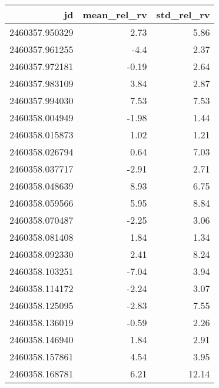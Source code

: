\begin{tabular}{rrr}
\toprule
jd & mean_rel_rv & std_rel_rv \\
\midrule
2460357.950329 & 2.73 & 5.86 \\
2460357.961255 & -4.4 & 2.37 \\
2460357.972181 & -0.19 & 2.64 \\
2460357.983109 & 3.84 & 2.87 \\
2460357.994030 & 7.53 & 7.53 \\
2460358.004949 & -1.98 & 1.44 \\
2460358.015873 & 1.02 & 1.21 \\
2460358.026794 & 0.64 & 7.03 \\
2460358.037717 & -2.91 & 2.71 \\
2460358.048639 & 8.93 & 6.75 \\
2460358.059566 & 5.95 & 8.84 \\
2460358.070487 & -2.25 & 3.06 \\
2460358.081408 & 1.84 & 1.34 \\
2460358.092330 & 2.41 & 8.24 \\
2460358.103251 & -7.04 & 3.94 \\
2460358.114172 & -2.24 & 3.07 \\
2460358.125095 & -2.83 & 7.55 \\
2460358.136019 & -0.59 & 2.26 \\
2460358.146940 & 1.84 & 2.91 \\
2460358.157861 & 4.54 & 3.95 \\
2460358.168781 & 6.21 & 12.14 \\
\bottomrule
\end{tabular}
